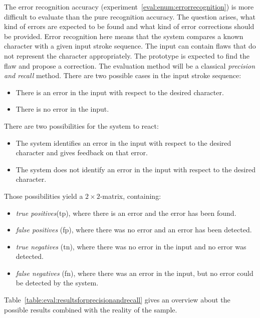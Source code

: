 The error recognition accuracy (experiment~\ref{eval:enum:errorrecognition}) 
is more difficult to evaluate than the pure recognition accuracy.
The question arises, what kind of errors are expected to be found
and what kind of error corrections should be provided.
Error recognition here means that the system compares a known character with 
a given input stroke sequence. The input can contain flaws that do not 
represent the character appropriately. The prototype is expected to find the flaw
and propose a correction.
The evaluation method will be a classical \emph{precision and recall} method.
There are two possible cases in the input stroke sequence:
\begin{itemize}
  \item There is an error in the input with respect to the desired character.
  \item There is no error in the input.
\end{itemize}
There are two possibilities for the system to react:
\begin{itemize}
  \item The system identifies an error in the input with respect to the desired
        character and gives feedback on that error.
  \item The system does not identify an error in the input with respect to the
        desired character.
\end{itemize}
Those possibilities yield a \(2 \times 2\)-matrix, containing:
\begin{itemize}
  \item \emph{true positives}(tp), where there is an error and the error has 
    been found.
  \item \emph{false positives} (fp), where there was no error and an error
    has been detected.
  \item \emph{true negatives} (tn), where there was no error in the input and
    no error was detected.
  \item \emph{false negatives} (fn), where there was an error in the input,
    but no error could be detected by the system.
\end{itemize}
Table~\ref{table:eval:resultsforprecisionandrecall} gives an overview about 
the possible results combined with the reality of the sample.

